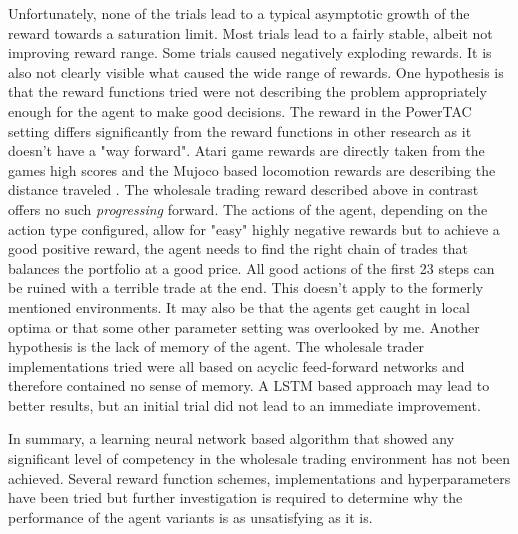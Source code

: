 Unfortunately, none of the trials lead to a typical asymptotic growth of the reward towards a saturation limit. Most
trials lead to a fairly stable, albeit not improving reward range. Some trials caused negatively exploding rewards. 
It is also not clearly visible what caused the wide range of rewards. One hypothesis is that the reward functions tried
were not describing the problem appropriately enough for the agent to make good decisions. The reward in the
\ac{PowerTAC} setting differs significantly from the reward functions in other research as it doesn't have a "way
forward". Atari game rewards are directly taken from the games high scores and the Mujoco based locomotion rewards are 
describing the distance traveled \cite[]{heess2017emergence}. The wholesale trading reward described above in contrast offers no
such \emph{progressing} forward. The actions of the agent, depending on the action type configured, allow for "easy" highly
negative rewards but to achieve a good positive reward, the agent needs to find the right chain of trades that balances
the portfolio at a good price. All good actions of the first 23 steps can be ruined with a terrible trade at the end.
This doesn't apply to the formerly mentioned environments. It may also be that the agents get caught in local optima or that
some other parameter setting was overlooked by me. Another hypothesis is the lack of memory of the agent. The wholesale
trader implementations tried were all based on acyclic feed-forward networks and therefore contained no sense of memory.
A \ac{LSTM} based approach may lead to better results, but an initial trial did not lead to an immediate improvement.

In summary, a learning neural network based algorithm that showed any significant level of
competency in the wholesale trading environment has not been achieved. Several reward function schemes, implementations
and hyperparameters have been tried but further investigation is required to determine why the performance of the agent
variants is as unsatisfying as it is. 





